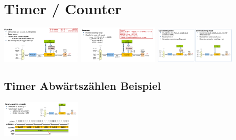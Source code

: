 \section{Timer / Counter}
\includegraphics[width=0.3\textwidth]{sections/images/timer_func.png}
\includegraphics[width=0.3\textwidth]{sections/images/timer_prescaler.png}
\includegraphics[width=0.3\textwidth]{sections/images/timer_up_down.png}

\subsection{Timer Abwärtszählen Beispiel}
\includegraphics[width=0.3\textwidth]{sections/images/timer_down.png}
